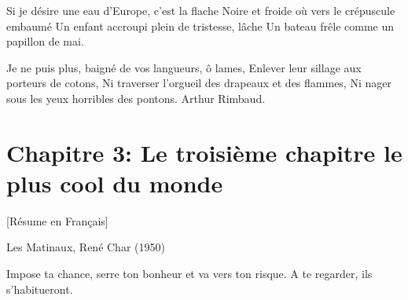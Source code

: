 Si je désire une eau d'Europe, c'est la flache
Noire et froide où vers le crépuscule embaumé
Un enfant accroupi plein de tristesse, lâche
Un bateau frêle comme un papillon de mai.

Je ne puis plus, baigné de vos langueurs, ô lames,
Enlever leur sillage aux porteurs de cotons,
Ni traverser l'orgueil des drapeaux et des flammes,
Ni nager sous les yeux horribles des pontons.
Arthur Rimbaud. 

\section*{Chapitre 3: Le troisième chapitre le plus cool du monde}

[Résume en Français]\newline \newline

Les Matinaux, René Char (1950) 

Impose ta chance, serre ton bonheur et va vers ton risque. A te regarder, ils s'habitueront.


